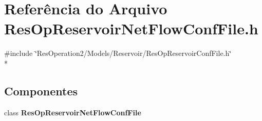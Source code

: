 \section{Referência do Arquivo Res\+Op\+Reservoir\+Net\+Flow\+Conf\+File.\+h}
\label{_res_op_reservoir_net_flow_conf_file_8h}
{\ttfamily \#include \char`\"{}Res\+Operation2/\+Models/\+Reservoir/\+Res\+Op\+Reservoir\+Conf\+File.\+h\char`\"{}}\\*
\subsection*{Componentes}
\begin{DoxyCompactItemize}
\item 
class {\bf Res\+Op\+Reservoir\+Net\+Flow\+Conf\+File}
\end{DoxyCompactItemize}
